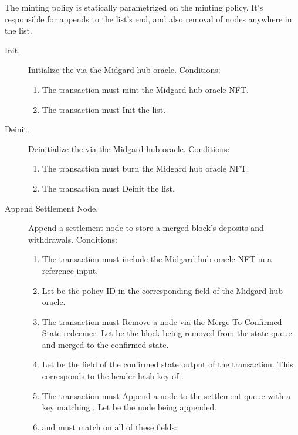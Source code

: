 \documentclass[../midgard.tex]{subfiles}
\begin{document}
The  minting policy is statically parametrized on the  minting policy.
It's responsible for appends to the  list's end, and also removal of nodes anywhere in the list.
\begin{description}
  \item[Init.] Initialize the  via the Midgard hub oracle.
    Conditions:
      \begin{enumerate}
        \item The transaction must mint the Midgard hub oracle NFT.
        \item The transaction must Init the  list.
      \end{enumerate}
  \item[Deinit.] Deinitialize the  via the Midgard hub oracle.
    Conditions:
      \begin{enumerate}
          \item The transaction must burn the Midgard hub oracle NFT.
          \item The transaction must Deinit the  list.
      \end{enumerate}
  \item[Append Settlement Node.] Append a settlement node to store a merged block's deposits and withdrawals.
    Conditions:
      \begin{enumerate}
        \item The transaction must include the Midgard hub oracle NFT in a reference input.
        \item Let  be the policy ID in the corresponding field of the Midgard hub oracle.
        \item The transaction must Remove a  node via the Merge To Confirmed State redeemer.
          Let  be the block being removed from the state queue and merged to the confirmed state.
        \item Let  be the  field of the confirmed state output of the transaction.
          This corresponds to the header-hash key of .
        \item The transaction must Append a node to the settlement queue with a key matching .
          Let  be the node being appended.
        \item {} and  must match on all of these fields:

\end{enumerate}
\end{description}
\end{document}
